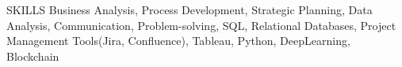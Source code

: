\documentclass{resume} %
\begin{document}















\begin{rSection}{SKILLS} 
Business Analysis, Process Development, Strategic Planning, Data Analysis, Communication, Problem-solving, SQL, Relational Databases, Project Management Tools(Jira, Confluence), Tableau, Python, DeepLearning, Blockchain
\end{rSection}
\end{document}
